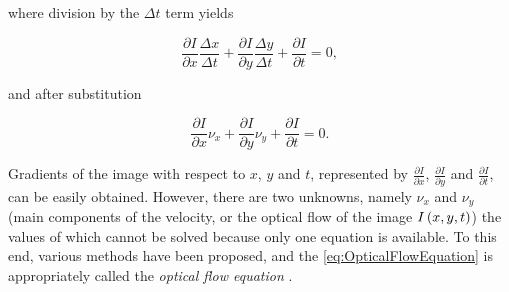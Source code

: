 \noindent where division by the $\Delta t$ term yields

\begin{equation}
    \frac{\partial I}{\partial x} \frac{\Delta x}{\Delta t} +
    \frac{\partial I}{\partial y} \frac{\Delta y}{\Delta t} +
    \frac{\partial I}{\partial t} = 0,
\end{equation}

\noindent and after substitution

\begin{equation}
    \label{eq:OpticalFlowEquation}
    \frac{\partial I}{\partial x} \nu_x +
    \frac{\partial I}{\partial y} \nu_y +
    \frac{\partial I}{\partial t} =
    0.
\end{equation}

Gradients of the image with respect to $x$, $y$ and $t$, represented by $\frac{\partial I}{\partial x}$, $\frac{\partial I}{\partial y}$ and $\frac{\partial I}{\partial t}$, can be easily obtained. However, there are two unknowns, namely $\nu_x$ and $\nu_y$ (main components of the velocity, or the optical flow of the image ${I} \left( x, y, t \right)$) the values of which cannot be solved because only one equation is available. To this end, various methods have been proposed, and the \cref{eq:OpticalFlowEquation} is appropriately called the \emph{optical flow equation} \cite{fleet2006optical}.